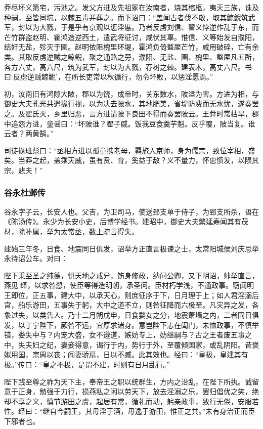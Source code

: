 \documentclass[]{article}
\begin{document}
莽尽坏义第宅，污池之。发父方进及先祖冢在汝南者，烧其棺柩，夷灭三族，诛及种嗣，至皆同坑，以棘五毒并葬之。而下诏曰：``盖闻古者伐不敬，取其鲸鲵筑武军，封以为大戮，于是乎有京观以惩淫慝。乃者反虏刘信、翟义悖逆作乱于东，而芒竹群盗赵明、霍鸿造逆西土，遣武将征讨，咸伏其辜。惟信、义等始发自濮阳，结奸无盐，殄灭于圉。赵明依阻槐里环堤，霍鸿负倚盩厔芒竹，咸用破碎，亡有余类。其取反虏逆贼之鲸鲵，聚之通路之旁，濮阳、无盐、圉、槐里、盩厔凡五所，各方六丈，高六尺，筑为武军，封以为大戮，荐树之棘。建表木，高丈六尺。书曰`反虏逆贼鲸鲵'，在所长吏常以秋循行，勿令坏败，以惩淫慝焉。''

初，汝南旧有鸿隙大陂，郡以为饶，成帝时，关东数水，陂溢为害。方进为相，与御史大夫孔光共遣掾行视，以为决去陂水，其地肥美，省堤防费而无水忧，遂奏罢之。及翟氏灭，乡里归恶，言方进请陂下良田不得而奏罢陂云。王莽时常枯旱，郡中追怨方进，童谣曰：``坏陂谁？翟子威。饭我豆食羹芋魁。反乎覆，陂当复。谁云者？两黄鹄。''

司徒掾班彪曰：``丞相方进以孤童携老母，羁旅入京师，身为儒宗，致位宰相，盛矣。当莽之起，盖乘天威，虽有贲、育，奚益于敌？义不量力，怀忠愤发，以陨其宗，悲夫！''

\hypertarget{header-n5765}{%
\subsubsection{谷永杜邺传}\label{header-n5765}}

谷永字子云，长安人也。父吉，为卫司马，使送郅支单于侍子，为郅支所杀，语在《陈汤传》。永少为长安小史，后博学经书。建昭中，御史大夫繁延寿闻其有茂材，除补属，举为太常丞，数上疏言得失。

建始三年冬，日食、地震同日俱发，诏举方正直言极谏之士，太常阳城侯刘庆忌举永待诏公车。对曰：

陛下秉至圣之纯德，惧天地之戒异，饬身修政，纳问公卿，又下明诏，帅举直言，燕见绎，以求咎愆，使臣等得造明朝，承圣问。臣材朽学浅，不通政事。窃闻明王即位，正五事，建大中，以承天心，则庶征序于下，日月理于上；如人君淫溺后宫，船乐游田，五事失于躬，大中之道不立，则咎征降而六极至。凡灾异之发，各象过失，以类告人。乃十二月朔戊申，日食婺女之分，地震萧墙之内，二者同日俱发，以丁宁陛下，厥咎不远，宜厚求诸身。意岂陛下志在闺门，未恤政事，不慎举错，娄失中与？内宠大盛，女不遵道，嫉妨专上，妨继嗣与？古之王者废五事之中，失夫妇之纪，妻妾得意，谒行于内，势行于外，至覆倾国家，或乱阴阳。昔褒姒用国，宗周以丧；阎妻骄扇，日以不臧。此其效也。经曰：``皇极，皇建其有极。''传曰：``皇之不极，是谓不建，时则有日月乱行。''

陛下践至尊之祚为天下主，奉帝王之职以统群生，方内之治乱，在陛下所执。诚留意于正身，勉强于力行，损燕私之闲以劳天下，放去淫溺之乐，罢归倡优之笑，绝却不享之义，慎节游田之虞，起居有常，循礼而动，躬亲政事，致行无倦，安服若性。经曰：``继自今嗣王，其毋淫于酒，毋逸于游田，惟正之共。''未有身治正而臣下邪者也。
\end{document}
